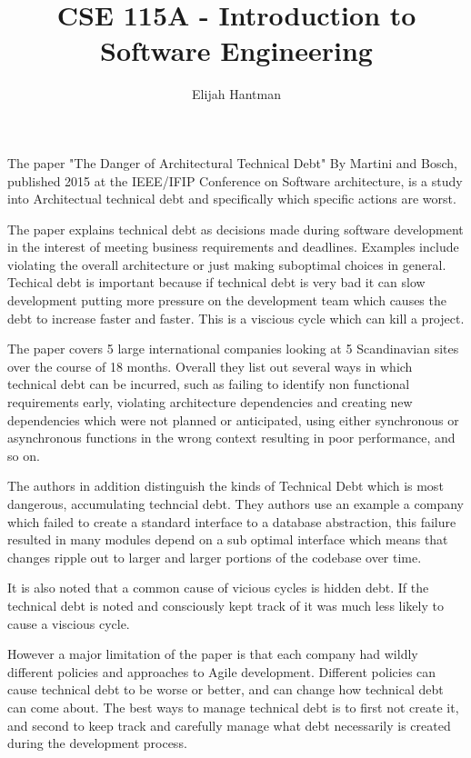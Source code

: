 \documentclass{report}
\title{\Huge{CSE 115A - Introduction to Software Engineering}}
\author{\huge{Elijah Hantman}}
\date{}
\begin{document}
\maketitle
\newpage

The paper "The Danger of Architectural Technical Debt" By
Martini and Bosch, published 2015 at the IEEE/IFIP Conference
on Software architecture, is a study into Architectual technical
debt and specifically which specific actions are worst.

The paper explains technical debt as decisions made during software
development in the interest of meeting business requirements and
deadlines. Examples include violating the overall architecture
or just making suboptimal choices in general. Techical debt is important
because if technical debt is very bad it can slow development putting
more pressure on the development team which causes the debt to increase
faster and faster. This is a viscious cycle which can kill a project.

The paper covers 5 large international companies looking
at 5 Scandinavian sites over the course of 18 months. Overall
they list out several ways in which technical debt can be
incurred, such as failing to identify non functional requirements
early, violating architecture dependencies and creating new
dependencies which were not planned or anticipated, using either
synchronous or asynchronous functions in the wrong context resulting
in poor performance, and so on. 

The authors in addition distinguish the kinds of Technical Debt
which is most dangerous, accumulating techncial debt. They authors
use an example a company which failed to create a standard interface
to a database abstraction, this failure resulted in many modules
depend on a sub optimal interface which means that changes ripple
out to larger and larger portions of the codebase over time.

It is also noted that a common cause of vicious cycles is hidden
debt. If the technical debt is noted and consciously kept track
of it was much less likely to cause a viscious cycle.

However a major limitation of the
paper is that each company had wildly different policies and 
approaches to Agile development. Different policies can cause
technical debt to be worse or better, and can change how
technical debt can come about. The best ways to manage
technical debt is to first not create it, and second to keep
track and carefully manage what debt necessarily is created
during the development process.
\end{document}
